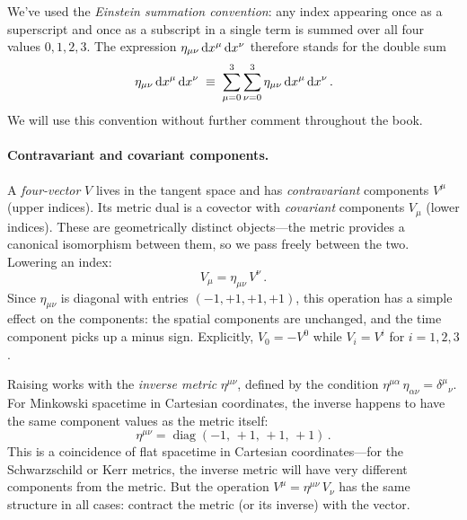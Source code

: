 We've used the \emph{Einstein summation convention}: any index appearing once
as a superscript and once as a subscript in a single term is summed over all
four values $0, 1, 2, 3$.  The expression $\eta_{\mu\nu}\,\mathrm{d} x^\mu\,\mathrm{d}
x^\nu$ therefore stands for the double sum
%
\begin{equation*}
  \eta_{\mu\nu}\,\mathrm{d} x^\mu\,\mathrm{d} x^\nu
    \;\equiv\;
    \sum_{\mu=0}^{3}\sum_{\nu=0}^{3}
    \eta_{\mu\nu}\,\mathrm{d} x^\mu\,\mathrm{d} x^\nu \,.
\end{equation*}
%
We will use this convention without further comment throughout the book.

\paragraph{Contravariant and covariant components.}

A \emph{four-vector} $V$ lives in the tangent space and has
\emph{contravariant} components $V^\mu$ (upper indices).  Its metric dual is a
covector with \emph{covariant} components $V_\mu$ (lower indices).  These are
geometrically distinct objects---the metric provides a canonical isomorphism
between them, so we pass freely between the two.  Lowering an index:
%
\begin{equation}
  V_\mu = \eta_{\mu\nu}\, V^\nu \,.
  \label{eq:index-lowering}
\end{equation}
%
Since $\eta_{\mu\nu}$ is diagonal with entries $(-1, +1, +1, +1)$, this
operation has a simple effect on the components: the spatial components are
unchanged, and the time component picks up a minus sign.  Explicitly,
$V_0 = -V^0$ while $V_i = V^i$ for $i = 1, 2, 3$.

Raising works with the \emph{inverse metric} $\eta^{\mu\nu}$, defined by the
condition $\eta^{\mu\alpha}\,\eta_{\alpha\nu} = \delta^\mu{}_\nu$.  For
Minkowski spacetime in Cartesian coordinates, the inverse happens to have the
same component values as the metric itself:
%
\begin{equation}
  \eta^{\mu\nu}
    = \operatorname{diag}(-1,\, +1,\, +1,\, +1) \,.
  \label{eq:minkowski-inverse}
\end{equation}
%
This is a coincidence of flat spacetime in Cartesian coordinates---for the
Schwarzschild or Kerr metrics, the inverse metric will have very different
components from the metric.  But the operation $V^\mu = \eta^{\mu\nu}\,V_\nu$
has the same structure in all cases: contract the metric (or its inverse) with
the vector.

